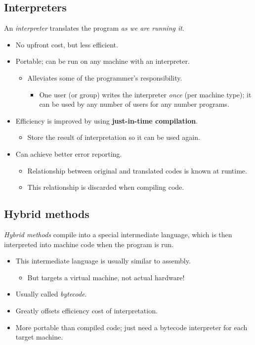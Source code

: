 \documentclass[11pt]{article}
\theoremstyle{definition}
\begin{document}
\subsection{Interpreters}
\label{sec:orga4e2231}
An \emph{interpreter} translates the program \emph{as we are running it}.
\begin{itemize}
\item No upfront cost, but less efficient.
\item Portable; can be run on any machine with an interpreter.
\begin{itemize}
\item Alleviates some of the programmer's responsibility.
\begin{itemize}
\item One user (or group) writes the interpreter \emph{once}
(per machine type);
it can be used by any number of users for any number programs.
\end{itemize}
\end{itemize}
\item Efficiency is improved by using \textbf{just-in-time compilation}.
\begin{itemize}
\item Store the result of interpretation so it can be used again.
\end{itemize}
\item Can achieve better error reporting.
\begin{itemize}
\item Relationship between original and translated codes is known at runtime.
\item This relationship is discarded when compiling code.
\end{itemize}
\end{itemize}

\subsection{Hybrid methods}
\label{sec:orgfb8a43b}
\emph{Hybrid methods} compile into a special intermediate language,
which is then interpreted into machine code when the program is run.
\begin{itemize}
\item This intermediate language is usually similar to assembly.
\begin{itemize}
\item But targets a virtual machine, not actual hardware!
\end{itemize}
\item Usually called \emph{bytecode}.
\item Greatly offsets efficiency cost of interpretation.
\item More portable than compiled code; just need
a bytecode interpreter for each target machine.
\end{itemize}
\end{document}
